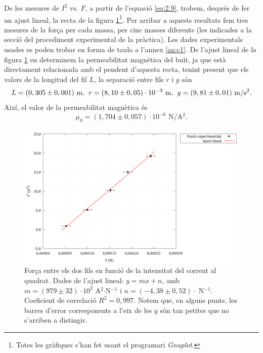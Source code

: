 \documentclass[a4paper,10.5pt]{report}
\begin{document}
De les mesures de $I^2$ vs. $F$, a partir de l'equació \eqref{eq:2.9}, trobem, després de fer un ajust lineal, la recta de la figura \ref{fig:2.3}\footnote{Totes les gràfiques s'han fet usant el programari \textit{Gnuplot}.}. Per arribar a aquests resultats fem tres mesures de la força per cada massa, per cinc masses diferents (les indicades a la secció del procediment experimental de la pràctica). Les dades experimentals usades es poden trobar en forma de taula a l'annex \ref{an:c1}. De l'ajust lineal de la figura \ref{fig:2.3} en determinem la permeabilitat magnètica del buit, ja que està directament relacionada amb el pendent d'aquesta recta, tenint present que els valors de la longitud del fil $L$, la separació entre fils $r$ i $g$ són
\begin{equation*}
	L = (0,305\pm 0,001)\text{ m}, \hspace{0.15cm} r = (8,10\pm 0,05)\cdot10^{-3} \text{ m}, \hspace{0.15cm} g = (9,81\pm 0,01) \text{ m/s$^2$}.
\end{equation*}
Així, el valor de la permeabilitat magnètica és
\begin{equation*}
	\mu_0 = (1,704\pm0,057)\cdot 10^{-6} \text{ N/A$^2$}.
\end{equation*}

\begin{figure}
	\centering
\includegraphics[width=0.8\linewidth]{screenshot020}
\caption{Força entre els dos fils en funció de la intensitat del corrent al quadrat. Dades de l'ajust lineal: $y=mx+n$, amb $m = (979 \pm 32)\cdot 10^{2}$ A$^2$$\cdot$N$^{-1}$ i $n = (-4,38\pm0,52)\cdot$ N$^{-1}$. Coeficient de correlació $R^2=0,997$. Notem que, en alguns punts, les barres d'error corresponents a l'eix de les $y$ són tan petites que no s'arriben a distingir.}
\label{fig:2.3}
\end{figure}
\end{document}
